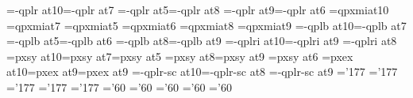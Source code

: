 \ifx\PT\undefined{}\fi
\ifx\altg\undefined\def\altg{}\fi
\ifx\fontenc\undefined{}\fi
\font\tenrm=\fontenc-qplr at10\PT \font\sevenrm=\fontenc-qplr at7\PT 
\font\fiverm=\fontenc-qplr at5\PT \font\eightrm=\fontenc-qplr at8\PT 
\font\ninerm=\fontenc-qplr at9\PT \font\sixrm=\fontenc-qplr at6\PT
%
\font\teni=qpxmi\altg\space at10\PT 
\font\seveni=qpxmi\altg\space at7\PT 
\font\fivei=qpxmi\altg\space at5\PT
\font\sixi=qpxmi\altg\space  at6\PT  
\font\eighti=qpxmi\altg\space  at8\PT 
\font\ninei=qpxmi\altg\space  at9\PT
%
\font\tenbf=\fontenc-qplb at10\PT \font\sevenbf=\fontenc-qplb at7\PT 
\font\fivebf=\fontenc-qplb at5\PT \font\sixbf=\fontenc-qplb at6\PT  
\font\eightbf=\fontenc-qplb at8\PT \font\ninebf=\fontenc-qplb at9\PT
%
\font\tenit=\fontenc-qplri at10\PT \font\nineit=\fontenc-qplri at9\PT 
\font\eightit=\fontenc-qplri at8\PT
%
\font\tensy=pxsy at10\PT \font\sevensy=pxsy at7\PT \font\fivesy=pxsy at5\PT
\font\eightsy=pxsy at8\PT \font\ninesy=pxsy at9\PT
\font\sixsy=pxsy at6\PT
\font\tenex=pxex at10\PT \font\eightex=pxex at9\PT \font\nineex=pxex at9\PT
%
\font\tencsc=\fontenc-qplr-sc at10\PT \font\eightcsc=\fontenc-qplr-sc at8\PT
\font\ninecsc=\fontenc-qplr-sc at9\PT
%
\skewchar\teni='177 \skewchar\ninei='177 \skewchar\eighti='177
\skewchar\seveni='177 \skewchar\fivei='177
\skewchar\tensy='60 \skewchar\ninesy='60 \skewchar\eightsy='60
\skewchar\sevensy='60 \skewchar\fivesy='60
%
\def\eightpoint{\def\rm{\fam0\eightrm}%
\textfont0\eightrm \scriptfont0=\sixrm \scriptscriptfont0=\fiverm
\textfont1\eighti  \scriptfont1=\sixi  \scriptscriptfont1=\fivei
\textfont2\eightsy \scriptfont2=\sixsy   \scriptscriptfont2=\fivesy
\textfont3\eightex \scriptfont3=\eightex \scriptscriptfont3=\eightex
\def\mit{\fam1}\def\oldstyle{\fam1\eighti}\def\cal{\fam2}%
\textfont\itfam=\eightit \def\it{\fam\itfam\eightit}%
\textfont\bffam=\eightbf \scriptfont\bffam=\sixbf\scriptscriptfont\bffam=\fivebf
\def\bf{\fam\bffam\eightbf}%
\let\sc=\eightcsc
\normalbaselineskip=10\PT
\setbox\strutbox=\hbox{\vrule height7.6\PT depth 2.4\PT width0pt}%
\normalbaselines\rm}
\def\ninepoint{\def\rm{\fam0\ninerm}%
\textfont0=\ninerm \scriptfont0=\sixrm \scriptscriptfont0=\fiverm
\textfont1=\ninei  \scriptfont1=\sixi  \scriptscriptfont1=\fivei
\textfont2=\ninesy \scriptfont2=\sixsy  \scriptscriptfont2=\fivesy
\textfont3=\nineex \scriptfont3=\nineex \scriptscriptfont3=\nineex
\def\mit{\fam1}\def\oldstyle{\fam1\ninei}\def\cal{\fam2}%
\textfont\itfam=\nineit \def\it{\fam\itfam\nineit}%
\textfont\bffam=\ninebf \scriptfont\bffam=\sixbf \scriptscriptfont\bffam=\fivebf
\def\bf{\fam\bffam\ninebf}%
\let\sc=\ninecsc
\normalbaselineskip=11\PT
\setbox\strutbox=\hbox{\vrule height8\PT depth3\PT width0pt}%
\normalbaselines\rm}
